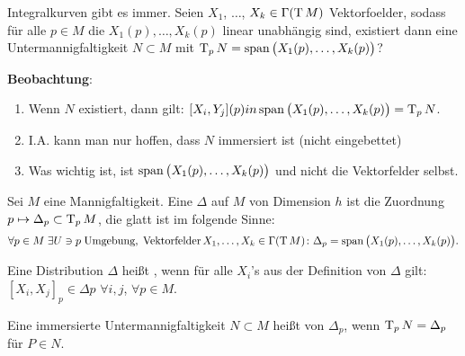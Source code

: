 Integralkurven gibt es immer. Seien $X_1$, $\dots$, $X_k\in\Gamma(\operatorname{T} M)$ Vektorfoelder, sodass für alle $p\in M$ die $X_1(p),\dots,X_k(p)$ linear unabhängig sind, existiert dann eine Untermannigfaltigkeit $N\subset M$ mit $\operatorname{T}_p N = \operatorname{span}\big(X_1(p),\dots,X_k(p)\big)$?

\textbf{Beobachtung}:\begin{enumerate}[label={(\arabic*)},topsep=-0.25\baselineskip]
	\item Wenn $N$ existiert, dann gilt: $[X_i,Y_j](p)in\operatorname{span}\big(X_1(p),\dots,X_k(p)\big) = \operatorname{T}_p N$.
	\item I.A. kann man nur hoffen, dass $N$ immersiert ist (nicht eingebettet)
	\item Was wichtig ist, ist $\operatorname{span}\big(X_1(p),\dots, X_k(p)\big)$ und nicht die Vektorfelder selbst.
\end{enumerate}
\vspace*{0.5\baselineskip}

\begin{definition}
		Sei $M$ eine Mannigfaltigkeit. Eine  $\Delta$ auf $M$ von Dimension $h$ ist die Zuordnung $p\mapsto \Delta_p\subset \operatorname{T}_p M$, die glatt ist im folgende Sinne: \begin{align*}
			\forall  p\in M\;\exists U\ni p\;\text{Umgebung},\;\text{Vektorfelder}\, X_1,\dots,X_k\in\Gamma(\operatorname{T} M)\colon \Delta_p = \operatorname{span}\big(X_1(p),\dots,X_k(p)\big).
		\end{align*}
\end{definition}

\begin{definition}
	Eine Distribution $\Delta$ heißt , wenn für alle $X_i$'s aus der Definition von $\Delta$ gilt: $[X_i,X_j]_p\in\Delta p$ $\forall i,j$, $\forall p\in M$.
\end{definition}

\begin{definition}
	Eine immersierte Untermannigfaltigkeit $N\subset M$ heißt  von $\Delta_p$, wenn $\operatorname{T}_p N=\Delta_p$ für $P\in N$.
\end{definition}

